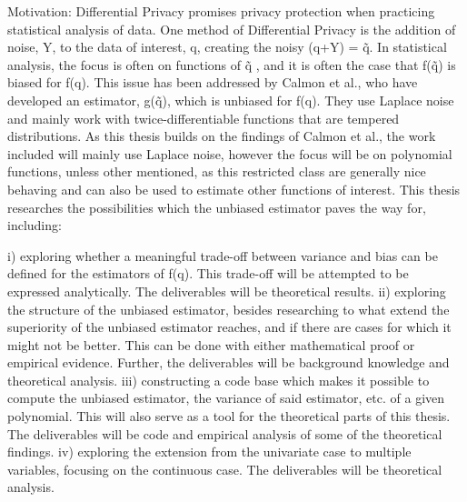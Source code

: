 Motivation: 
Differential Privacy promises privacy protection when practicing statistical analysis of data. One method of Differential Privacy is the addition of noise, Y, to the data of interest, q, creating the noisy (q+Y) = q̃.
In statistical analysis, the focus is often on functions of q̃ , and it is often the case that f(q̃) is biased for f(q). This issue has been addressed by Calmon et al., who have developed an estimator, g(q̃), which is unbiased for f(q). They use Laplace noise and mainly work with twice-differentiable functions that are tempered distributions. 
As this thesis builds on the findings of Calmon et al., the work included will mainly use Laplace noise, however the focus will be on polynomial functions, unless other mentioned, as this restricted class are generally nice behaving and can also be used to estimate other functions of interest.
This thesis researches the possibilities which the unbiased estimator paves the way for, including: 

i) exploring whether a meaningful trade-off between variance and bias can be defined for the estimators of f(q). This trade-off will be attempted to be expressed analytically. The deliverables will be theoretical results. 
ii) exploring the structure of the unbiased estimator, besides researching to what extend the superiority of the unbiased estimator reaches, and if there are cases for which it might not be better. This can be done with either mathematical proof or empirical evidence. Further, the deliverables will be background knowledge and theoretical analysis. 
iii) constructing a code base which makes it possible to compute the unbiased estimator, the variance of said estimator, etc. of a given polynomial. This will also serve as a tool for the theoretical parts of this thesis.   
The deliverables will be code and empirical analysis of some of the theoretical findings. 
iv) exploring the extension from the univariate case to multiple variables, focusing on the continuous case. The deliverables will be theoretical analysis. 
